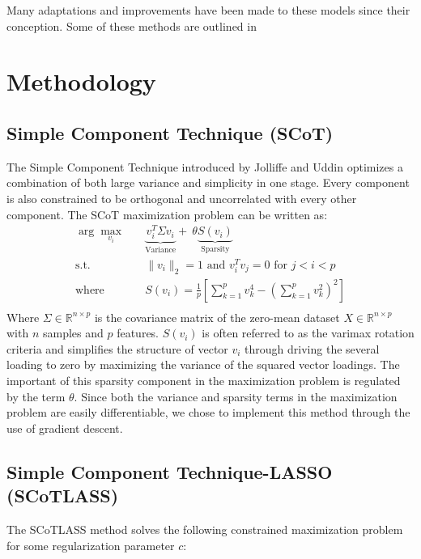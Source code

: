 \documentclass[11pt,letterpaper]{report}
\begin{document}
Many adaptations and improvements have been made to these models since their conception. Some of these methods are outlined in 

\section*{Methodology}


\subsection*{Simple Component Technique (SCoT)}
The Simple Component Technique introduced by Jolliffe and Uddin \cite{Jolliffe2000} optimizes a combination of both large variance and simplicity in one stage. Every component is also constrained to be orthogonal and uncorrelated with every other component. The SCoT maximization problem can be written as:
\begin{equation*}
\begin{aligned}
\arg\max_{v_{i}} \quad & \underbrace{v_{i}^{T}\Sigma v_{i}}_{\text{Variance}} +\ \theta\underbrace{S(v_{i})}_{\text{Sparsity}}\\
\textrm{s.t.} \quad & \lVert v_{i} \rVert_{2} = 1 \text{ and } v_{i}^{T}v_{j} = 0 \text{ for } j < i < p \\
\textrm{where} \quad & S(v_{i}) = \frac{1}{p}\left[\sum_{k=1}^{p} v_{k}^4- (\sum_{k=1}^{p} v_{k}^2)^2 \right]\\ 
\end{aligned}
\end{equation*}
Where $\Sigma\in\mathbb{R}^{n \times p}$ is the covariance matrix of the zero-mean dataset $X \in \mathbb{R}^{n\times p}$ with $n$ samples and $p$ features. $S(v_i)$ is often referred to as the varimax rotation criteria and simplifies the structure of vector $v_i$ through driving the several loading to zero by maximizing the variance of the squared vector loadings. The important of this sparsity component in the maximization problem is regulated by the term $\theta$. Since both the variance and sparsity terms in the maximization problem are easily differentiable, we chose to implement this method through the use of gradient descent.

\subsection*{Simple Component Technique-LASSO (SCoTLASS)}
The SCoTLASS method solves the following constrained maximization problem for some regularization parameter $c$:
\end{document}
